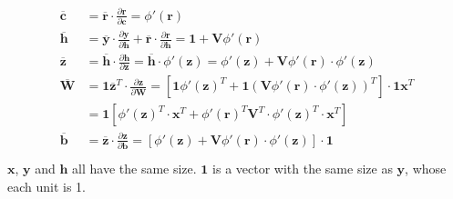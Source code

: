 \documentclass{myhw}
\begin{document}
\begin{homeworkProblem}
\begin{homeworkSection}
\begin{gather*}
\begin{aligned}
\overline{\textbf{c}} &= \overline{\textbf{r}} \cdot \frac{\partial{\textbf{r}}}{\partial{\textbf{c}}} = \phi'(\textbf{r}) \\
\overline{\textbf{h}} &= \overline{\textbf{y}} \cdot \frac{\partial\textbf{y}}{\partial\textbf{h}} + \overline{\textbf{r}} \cdot \frac{\partial\textbf{r}}{\partial\textbf{h}} = \textbf{1} + \textbf{V} \phi'(\textbf{r}) \\
\overline{\textbf{z}} &= \overline{\textbf{h}} \cdot \frac{\partial\textbf{h}}{\partial\textbf{z}} = \overline{\textbf{h}} \cdot \phi'(\textbf{z}) = \phi'(\textbf{z}) + \textbf{V} \phi'(\textbf{r}) \cdot \phi'(\textbf{z}) \\
\overline{\textbf{W}} &= \textbf{1} \overline{\textbf{z}}^T \cdot \frac{\partial\textbf{z}}{\partial\textbf{W}} = [\textbf{1} \phi'(\textbf{z})^T + \textbf{1} (\textbf{V} \phi'(\textbf{r}) \cdot \phi'(\textbf{z}))^T] \cdot \textbf{1} \textbf{x}^T \\
& = \textbf{1} [\phi'(\textbf{z})^T \cdot \textbf{x}^T + \phi'(\textbf{r})^T \textbf{V}^T \cdot \phi'(\textbf{z})^T \cdot \textbf{x}^T]\\
\overline{\textbf{b}} &= \overline{\textbf{z}} \cdot \frac{\partial\textbf{z}}{\partial\textbf{b}} = [\phi'(\textbf{z}) + \textbf{V} \phi'(\textbf{r}) \cdot \phi'(\textbf{z})] \cdot \textbf{1} \\
\end{aligned}
\end{gather*}
$\textbf{x}$, $\textbf{y}$ and $\textbf{h}$ all have the same size. $\textbf{1}$ is a vector with the same size as $\textbf{y}$, whose each unit is 1. 
\end{homeworkSection}
\end{homeworkProblem}
\end{document}
